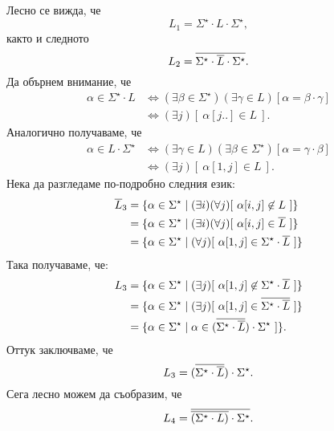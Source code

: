 \begin{hint}
  Лесно се вижда, че
  \[L_1 = \Sigma^\star \cdot L \cdot \Sigma^\star,\]
  както и следното
  \[L_2 = \overline{\Sigma^\star \cdot \overline{L} \cdot \Sigma^\star}.\]
  Да обърнем внимание, че
  \begin{align*}
    \alpha \in \Sigma^\star \cdot L & \iff (\exists \beta \in \Sigma^\star)(\exists \gamma \in L)[ \alpha = \beta \cdot \gamma]\\
                                    & \iff (\exists j)[\ \alpha[j..] \in L\ ].
  \end{align*}
  Аналогично получаваме, че
    \begin{align*}
      \alpha \in L\cdot \Sigma^\star & \iff (\exists \gamma \in L)(\exists \beta \in \Sigma^\star)[ \alpha = \gamma \cdot \beta ]\\
                                     & \iff (\exists j)[\ \alpha[1,j] \in L\ ].
  \end{align*}
  Нека да разгледаме по-подробно следния език:
  \begin{align*}
    \ov{L}_3 & = \{\alpha \in \Sigma^\star \mid (\exists i)(\forall j)[\ \alpha[i,j] \not\in L\ ]\}\\
             & = \{\alpha \in \Sigma^\star \mid (\exists i)(\forall j)[\ \alpha[i,j] \in \ov{L}\ ]\}\\
             & = \{\alpha \in \Sigma^\star \mid (\forall j)[\ \alpha[1,j] \in \Sigma^\star \cdot \ov{L}\ ]\}\\
  \end{align*}
  Така получаваме, че:
  \begin{align*}
    L_3 & = \{\alpha \in \Sigma^\star \mid (\exists j)[\ \alpha[1,j] \not\in \Sigma^\star \cdot \overline{L}\ ]\}\\
        & = \{\alpha \in \Sigma^\star \mid (\exists j)[\ \alpha[1,j] \in \overline{\Sigma^\star \cdot \overline{L}}\ ]\}\\
        & = \{\alpha \in \Sigma^\star \mid \alpha \in (\overline{\Sigma^\star \cdot \overline{L}}) \cdot \Sigma^\star \ ]\}.
  \end{align*}
  Оттук заключваме, че
  \[L_3 = (\overline{\Sigma^\star \cdot \overline{L}}) \cdot \Sigma^\star.\]
  Сега лесно можем да съобразим, че
  \[ L_4 = \overline{ \overline{(\Sigma^\star \cdot L)} \cdot \Sigma^\star}.\]
\end{hint}

